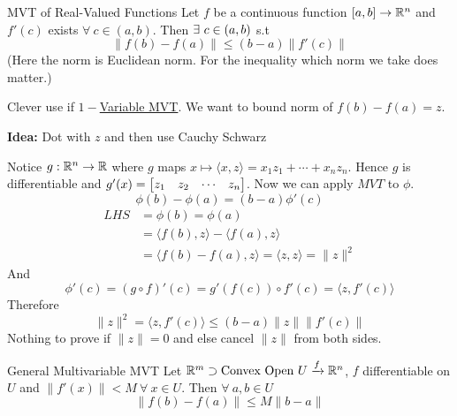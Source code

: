 \begin{theorem}{MVT of Real-Valued Functions}{}
	Let $f$ be a continuous function $[a,b]\to \mathbb{R}^n$ and $f'(c)$ exists $\forall\ c\in(a,b)$. Then $\exists\ c\in (a,b)$ s.t $$\|f(b)-f(a)\|\leq (b-a)\|f'(c)\|$$(Here the norm is Euclidean norm. For the inequality which norm we take does matter.)
\end{theorem}
\begin{myproof}
	Clever use if \hyperref[th:1varmvt]{$1-$Variable MVT}. We want to bound norm of $f(b)-f(a)=z$.\parinf

	\textbf{Idea: }Dot with $z$ and then use Cauchy Schwarz \parinn
	\begin{center}
	\end{center}
	Notice $g: \mathbb{R}^n\to\mathbb{R}$ where $g$ maps $x\longmapsto \langle x,z\rangle=x_1z_1+\cdots+x_nz_n$. Hence $g$ is differentiable and $g'(x)=\left[ \begin{matrix} z_1 & z_2 & \cdots & z_n\end{matrix}\right]$. Now we can apply $MVT$ to $\phi$. $$\phi(b)-\phi(a)=(b-a)\phi'(c)$$\begin{align*}
		LHS & =\phi(b)=\phi(a)\\
		& =\langle f(b),z\rangle -\langle f(a),z\rangle\\
		&=\langle f(b)-f(a),z\rangle=\langle z,z\rangle=\|z\|^2
	\end{align*}And$$\phi'(c)=(g\circ f)'(c)=g'(f(c))\circ f'(c)=\langle z ,f'(c)\rangle$$Therefore$$\|z\|^2=\langle z,f'(c)\rangle\leq (b-a)\|z\|\|f'(c)\|$$Nothing to prove if $\|z\|=0$ and else cancel $\|z\|$ from both sides.
\end{myproof}
\begin{theorem}{General Multivariable MVT}{}
	Let $\mathbb{R}^m\supset \text{Convex Open }U\xrightarrow{f}\mathbb{R}^n$, $ f$ differentiable on $U$ and $ \|f'(x)\|<M \ \forall\ x\in U$. Then $\forall\ a,b\in U$ $$\|f(b)-f(a)\|\leq M\|b-a\|$$
\end{theorem}

